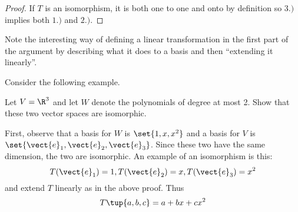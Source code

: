 \begin{proof}
If $T$ is an isomorphism, it is both one to one and onto by definition so $
3.)$ implies both $1.)$ and $2.)$.
\end{proof}

Note the interesting way of defining a linear transformation in the first
part of the argument by describing what it does to a basis and then
``extending it linearly''.

Consider the following example. 

\begin{example}{}{}
Let $V=\R^{3}$ and let $W$ denote the polynomials of degree at most
2. Show that these two vector spaces are isomorphic.
\end{example}

\begin{solution}
First, observe that a basis for $W$ is $\set{1,x,x^{2}} $ and a basis for $V$
is $\set{\vect{e}_{1},\vect{e}_{2},\vect{e}_{3}} $. Since these two
have the same dimension, the two are
isomorphic. An example of an isomorphism is this:\ 
\begin{equation*}
T(\vect{e}_{1})=1,T(\vect{e}_{2})=x,T(\vect{e}_{3})=x^{2}
\end{equation*}
and extend $T$ linearly as in the above proof. Thus 
\begin{equation*}
T\tup{a,b,c} =a+bx+cx^{2}
\end{equation*}
\end{solution}
